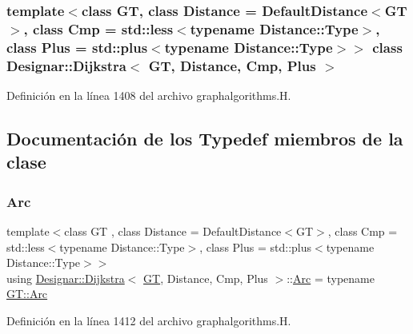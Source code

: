\subsubsection*{template$<$class GT, class Distance = Default\+Distance$<$\+G\+T$>$, class Cmp = std\+::less$<$typename Distance\+::\+Type$>$, class Plus = std\+::plus$<$typename Distance\+::\+Type$>$$>$\newline
class Designar\+::\+Dijkstra$<$ G\+T, Distance, Cmp, Plus $>$}



Definición en la línea 1408 del archivo graphalgorithms.\+H.



\subsection{Documentación de los \textquotesingle{}Typedef\textquotesingle{} miembros de la clase}
\mbox{\label{class_designar_1_1_dijkstra_a5f0682f4edfd1456b7d4432fa976c641}} 
\subsubsection{\texorpdfstring{Arc}{Arc}}
{\footnotesize\ttfamily template$<$class GT , class Distance  = Default\+Distance$<$\+G\+T$>$, class Cmp  = std\+::less$<$typename Distance\+::\+Type$>$, class Plus  = std\+::plus$<$typename Distance\+::\+Type$>$$>$ \\
using \hyperlink{class_designar_1_1_dijkstra}{Designar\+::\+Dijkstra}$<$ \hyperlink{demo-buildgraph_8_c_a3001c40d2c31ca87ed96cd7d1334a55e}{GT}, Distance, Cmp, Plus $>$\+::\hyperlink{class_designar_1_1_dijkstra_a5f0682f4edfd1456b7d4432fa976c641}{Arc} =  typename \hyperlink{class_designar_1_1_graph_a74c730ef4ce2d20f998d72bd25c2b5bf}{G\+T\+::\+Arc}}



Definición en la línea 1412 del archivo graphalgorithms.\+H.

\mbox{\label{class_designar_1_1_dijkstra_afeb644fc5395569ec366f0d220ab477d}} 
